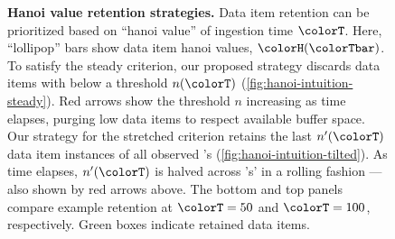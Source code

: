 \begin{figure}
\caption{%
  \textbf{Hanoi value retention strategies.}
  \footnotesize
  Data item retention can be prioritized based on ``hanoi value'' of ingestion time $\colorT$.
  Here, ``lollipop'' bars show data item hanoi values, $\colorH(\colorTbar)$.
  To satisfy the steady criterion, our proposed strategy discards data items with \hv{} below a threshold $n(\colorT)$ (\ref{fig:hanoi-intuition-steady}).
  Red arrows show the threshold $n$ increasing as time elapses, purging low \hv{} data items to respect available buffer space.
  Our strategy for the stretched criterion retains the last $n'(\colorT)$ data item instances of all observed \hv{}'s (\ref{fig:hanoi-intuition-tilted}).
  As time elapses, $n'(\colorT)$ is halved across \hv{}'s' in a rolling fashion --- also shown by red arrows above.
  The bottom and top panels compare example retention at $\colorT=50$ and $\colorT=100$, respectively.
  Green boxes indicate retained data items.
  }
\label{fig:hanoi-intuition}
\end{figure}
